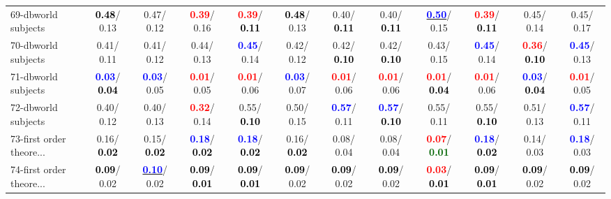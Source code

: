 \begin{table}[h]
\begin{center}
{\begin{tabular}{lc|c|c|c|c|c|c|c|c|c|c}
69-dbworld subjects & \textcolor{black}{\textbf{  0.48}}/  0.13 &   0.47/  0.12 & \textcolor{red}{\textbf{  0.39}}/  0.16 & \textcolor{red}{\textbf{  0.39}}/\textcolor{black}{\textbf{  0.11}} & \textcolor{black}{\textbf{  0.48}}/  0.13 &   0.40/\textcolor{black}{\textbf{  0.11}} &   0.40/\textcolor{black}{\textbf{  0.11}} & \underline{\textcolor{blue}{\textbf{  0.50}}}/  0.15 & \textcolor{red}{\textbf{  0.39}}/\textcolor{black}{\textbf{  0.11}} &   0.45/  0.14 &   0.45/  0.17 \\
70-dbworld subjects &   0.41/  0.11 &   0.41/  0.12 &   0.44/  0.13 & \textcolor{blue}{\textbf{  0.45}}/  0.14 &   0.42/  0.12 &   0.42/\textcolor{black}{\textbf{  0.10}} &   0.42/\textcolor{black}{\textbf{  0.10}} &   0.43/  0.15 & \textcolor{blue}{\textbf{  0.45}}/  0.14 & \textcolor{red}{\textbf{  0.36}}/\textcolor{black}{\textbf{  0.10}} & \textcolor{blue}{\textbf{  0.45}}/  0.13 \\
71-dbworld subjects & \textcolor{blue}{\textbf{  0.03}}/\textcolor{black}{\textbf{  0.04}} & \textcolor{blue}{\textbf{  0.03}}/  0.05 & \textcolor{red}{\textbf{  0.01}}/  0.05 & \textcolor{red}{\textbf{  0.01}}/  0.06 & \textcolor{blue}{\textbf{  0.03}}/  0.07 & \textcolor{red}{\textbf{  0.01}}/  0.06 & \textcolor{red}{\textbf{  0.01}}/  0.06 & \textcolor{red}{\textbf{  0.01}}/\textcolor{black}{\textbf{  0.04}} & \textcolor{red}{\textbf{  0.01}}/  0.06 & \textcolor{blue}{\textbf{  0.03}}/\textcolor{black}{\textbf{  0.04}} & \textcolor{red}{\textbf{  0.01}}/  0.05 \\ \hline
72-dbworld subjects &   0.40/  0.12 &   0.40/  0.13 & \textcolor{red}{\textbf{  0.32}}/  0.14 &   0.55/\textcolor{black}{\textbf{  0.10}} &   0.50/  0.15 & \textcolor{blue}{\textbf{  0.57}}/  0.11 & \textcolor{blue}{\textbf{  0.57}}/\textcolor{black}{\textbf{  0.10}} &   0.55/  0.11 &   0.55/\textcolor{black}{\textbf{  0.10}} &   0.51/  0.13 & \textcolor{blue}{\textbf{  0.57}}/  0.11 \\
73-first order theore... &   0.16/\textcolor{black}{\textbf{  0.02}} &   0.15/\textcolor{black}{\textbf{  0.02}} & \textcolor{blue}{\textbf{  0.18}}/\textcolor{black}{\textbf{  0.02}} & \textcolor{blue}{\textbf{  0.18}}/\textcolor{black}{\textbf{  0.02}} &   0.16/\textcolor{black}{\textbf{  0.02}} &   0.08/  0.04 &   0.08/  0.04 & \textcolor{red}{\textbf{  0.07}}/\textcolor{darkgreen}{\textbf{  0.01}} & \textcolor{blue}{\textbf{  0.18}}/\textcolor{black}{\textbf{  0.02}} &   0.14/  0.03 & \textcolor{blue}{\textbf{  0.18}}/  0.03 \\
74-first order theore... & \textcolor{black}{\textbf{  0.09}}/  0.02 & \underline{\textcolor{blue}{\textbf{  0.10}}}/  0.02 & \textcolor{black}{\textbf{  0.09}}/\textcolor{black}{\textbf{  0.01}} & \textcolor{black}{\textbf{  0.09}}/\textcolor{black}{\textbf{  0.01}} & \textcolor{black}{\textbf{  0.09}}/  0.02 & \textcolor{black}{\textbf{  0.09}}/  0.02 & \textcolor{black}{\textbf{  0.09}}/  0.02 & \textcolor{red}{\textbf{  0.03}}/\textcolor{black}{\textbf{  0.01}} & \textcolor{black}{\textbf{  0.09}}/\textcolor{black}{\textbf{  0.01}} & \textcolor{black}{\textbf{  0.09}}/  0.02 & \textcolor{black}{\textbf{  0.09}}/  0.02 \\

\end{tabular}}
\end{center}
\end{table}
